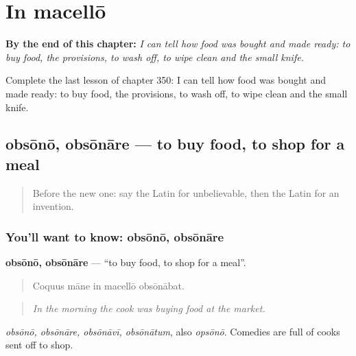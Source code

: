 
\chapter{In macellō}
\label{ch:la-in-macello}

\begin{chapteropening}
\textbf{By the end of this chapter:} \emph{I can tell how food was bought and made ready: to buy food, the provisions, to wash off, to wipe clean and the small knife.}

Complete the last lesson of chapter 350: I can tell how food was bought and made ready: to buy food, the provisions, to wash off, to wipe clean and the small knife.
\end{chapteropening}

\section[obsōnō, obsōnāre]{obsōnō, obsōnāre — to buy food, to shop for a meal}

\label{lesson:LA-C350-obsono}



\begin{quote}
Before the new one: say the Latin for unbelievable, then the Latin for an invention.
\end{quote}

\subsection*{You'll want to know: obsōnō, obsōnāre}
\textbf{obsōnō, obsōnāre} — \textquotedblleft{}to buy food, to shop for a meal\textquotedblright{}.

\begin{quote}
Coquus māne in macellō obsōnābat.
\end{quote}

\begin{quote}
\emph{In the morning the cook was buying food at the market.}
\end{quote}

\emph{obsōnō, obsōnāre, obsōnāvī, obsōnātum}, also \emph{opsōnō}. Comedies are full of cooks sent off to shop.

